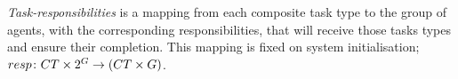 \newcommand{\formalTaskResponsibilities}[2]{
	\functionFormal{resp}
	{\setCompositeTask{}{} \times \powerSetAgent{}{}{}{}}
	({\setCompositeTask{}{} \times \setAgent{}{}})
}
\newcommand{\functionTaskResponsibilities}[2]{
	\functionSignature{resp}
	{\varCompositeTask{}{}, \setAgent{}{}}
}
\textit{Task-responsibilities} is a mapping from each composite task type to the group of agents, with the corresponding responsibilities, that will receive those tasks types and ensure their completion. This mapping is fixed on system initialisation; $\formalTaskResponsibilities{}{}$.


